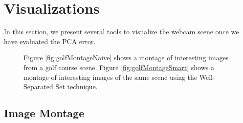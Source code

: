\pagebreak{}
\section{Visualizations}

In this section, we present several tools to visualize the webcam scene once we have evaluated the PCA error.

\begin{figure}[p]
	\centering
		\caption[Image montage techniques.]{Figure \ref{fig:golfMontageNaive} shows a montage of interesting images from a golf course scene. Figure \ref{fig:golfMontageSmart} shows a montage of interesting images of the same scene using the Well-Separated Set technique.}
\end{figure}

\subsection{Image Montage}

